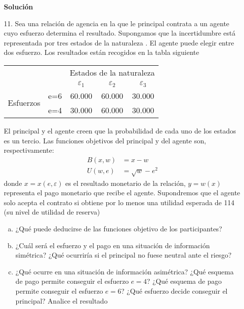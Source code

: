 \documentclass[10pt,a4paper]{article}
\begin{document}
\begin{enumerate}
			\textbf{\large Solución}\\
				
		\item [11.] Sea una relación de agencia en la que le principal contrata a un agente cuyo esfuerzo determina el resultado. Supongamos que la incertidumbre está representada  por tres estados de la naturaleza . El agente puede elegir entre dos esfuerzo. Los resultados están recogidos en la tabla siguiente
						\begin{center}
							\begingroup
								\setlength{\tabcolsep}{10pt} %
								\renewcommand{\arraystretch}{1.5} %
									\begin{tabular}{cc|ccc}
												&& \multicolumn{3}{c}{Estados de la naturaleza}\\
												&& $\varepsilon_1$ & $\varepsilon_2$ & $\varepsilon_3$\\
										\hline
											\multirow{2}{*}{Esfuerzos} & e=6 & 60.000 & 60.000 & 30.000\\
																	   & e=4 & 30.000 & 60.000 & 30.000
									\end{tabular}
							\endgroup
						\end{center}
		El principal y el agente creen que la probabilidad de cada uno de los estados es un tercio. Las funciones objetivos del principal y del agente son, respectivamente:
				\begin{align*}
					B(x,w) & = x-w\\
					U(w,e) & = \sqrt{w} - e^2
				\end{align*}
		donde $x=x(e,\varepsilon)$ es el resultado monetario de la relación, $y=w(x)$ representa el pago monetario que recibe el agente. Supondremos que el agente solo acepta el contrato si obtiene por lo menos una utilidad esperada de 114 (su nivel de utilidad de reserva)
			\begin{enumerate}[a)]
				\item ¿Qué puede deducirse de las funciones objetivo de los participantes?
				\item ¿Cuál será el esfuerzo y el pago en una situación de información simétrica? ¿Qué ocurriría si el principal no fuese neutral ante el riesgo?
				\item ¿Qué ocurre en una situación de información asimétrica? ¿Qué esquema de pago permite conseguir el esfuerzo $e=4$? ¿Qué esquema de pago permite conseguir el esfuerzo $e=6$? ¿Qué esfuerzo decide conseguir el principal? Analice el resultado
			\end{enumerate}

\end{enumerate}
\end{document}
